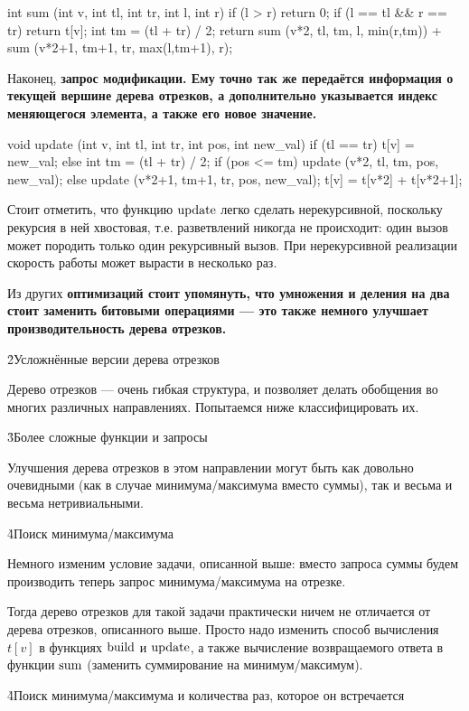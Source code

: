 \code
int sum (int v, int tl, int tr, int l, int r) {
	if (l > r)
		return 0;
	if (l == tl && r == tr)
		return t[v];
	int tm = (tl + tr) / 2;
	return sum (v*2, tl, tm, l, min(r,tm))
		+ sum (v*2+1, tm+1, tr, max(l,tm+1), r);
}
\endcode

Наконец, \bf{запрос модификации}. Ему точно так же передаётся информация о текущей вершине дерева отрезков, а дополнительно указывается индекс меняющегося элемента, а также его новое значение.

\code
void update (int v, int tl, int tr, int pos, int new_val) {
	if (tl == tr)
		t[v] = new_val;
	else {
		int tm = (tl + tr) / 2;
		if (pos <= tm)
			update (v*2, tl, tm, pos, new_val);
		else
			update (v*2+1, tm+1, tr, pos, new_val);
		t[v] = t[v*2] + t[v*2+1];
	}
}
\endcode

Стоит отметить, что функцию $\rm update$ легко сделать нерекурсивной, поскольку рекурсия в ней хвостовая, т.е. разветвлений никогда не происходит: один вызов может породить только один рекурсивный вызов. При нерекурсивной реализации скорость работы может вырасти в несколько раз.

Из других \bf{оптимизаций} стоит упомянуть, что умножения и деления на два стоит заменить битовыми операциями --- это также немного улучшает производительность дерева отрезков.


\h2{Усложнённые версии дерева отрезков}

Дерево отрезков --- очень гибкая структура, и позволяет делать обобщения во многих различных направлениях. Попытаемся ниже классифицировать их.


\h3{Более сложные функции и запросы}

Улучшения дерева отрезков в этом направлении могут быть как довольно очевидными (как в случае минимума/максимума вместо суммы), так и весьма и весьма нетривиальными.

\h4{Поиск минимума/максимума}

Немного изменим условие задачи, описанной выше: вместо запроса суммы будем производить теперь запрос минимума/максимума на отрезке.

Тогда дерево отрезков для такой задачи практически ничем не отличается от дерева отрезков, описанного выше. Просто надо изменить способ вычисления $t[v]$ в функциях $\rm build$ и $\rm update$, а также вычисление возвращаемого ответа в функции $\rm sum$ (заменить суммирование на минимум/максимум).

\h4{Поиск минимума/максимума и количества раз, которое он встречается}

